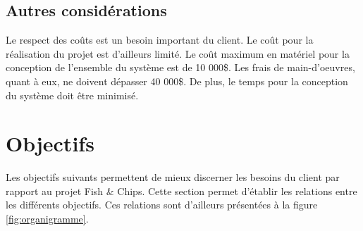 \subsection{Autres considérations}

Le respect des coûts est un besoin important du client. Le coût pour la réalisation du projet est d'ailleurs limité. Le coût maximum en matériel pour la conception de l'ensemble du système est de 10 000\$. Les frais de main-d'oeuvres, quant à eux, ne doivent dépasser 40 000\$. De plus, le temps pour la conception du système doit être minimisé.

\newpage{}

\section{Objectifs}
Les objectifs suivants permettent de mieux discerner les besoins du client par rapport au projet Fish \& Chips. Cette section permet d'établir les relations entre les différents objectifs. Ces relations sont d'ailleurs présentées à la figure \ref{fig:organigramme}.

